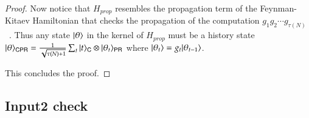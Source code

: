 \begin{proof}
	Now notice that $H_{prop}$ resembles the propagation term of the Feynman-Kitaev Hamiltonian that checks the propagation of the computation $g_1 g_2 \cdots g_{\tau(N)}$~\cite{kitaev2002classical}. Thus any state $|\theta\rangle$ in the kernel of $H_{prop}$ must be a history state $|\theta\rangle_{{\mathsf{C}} {\mathsf{P}} {\mathsf{R}}} = \frac{1}{\sqrt{\tau(N)+1}} \sum_t |t\rangle_{{\mathsf{C}}} \otimes |\theta_t\rangle_{{\mathsf{P}} {\mathsf{R}}}$ where $|\theta_t\rangle = g_t |\theta_{t-1}\rangle$.
	
	This concludes the proof.
	
	
	
\end{proof}


\subsection{Input2 check}
\label{sec:input_check}


